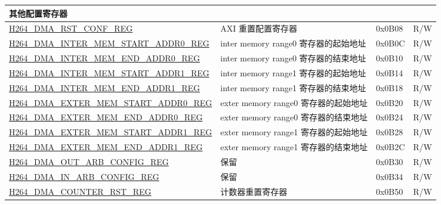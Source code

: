 \begin{longtable}{ | p{7.5cm} | p{5.7cm} | p{1.2cm} | p{1.5cm} | }
    \multicolumn{4}{|l|}{\textbf{其他配置寄存器}} \\ \hline
    \hyperref[regdesc:H264DMARSTCONFREG]{H264\_DMA\_RST\_CONF\_REG} & AXI 重置配置寄存器 & 0x0B08 & R/W \\ \hline
    \hyperref[regdesc:H264DMAINTERMEMSTARTADDR0REG]{H264\_DMA\_INTER\_MEM\_START\_ADDR0\_REG} & inter memory range0 寄存器的起始地址 & 0x0B0C & R/W \\ \hline
    \hyperref[regdesc:H264DMAINTERMEMENDADDR0REG]{H264\_DMA\_INTER\_MEM\_END\_ADDR0\_REG} & inter memory range0 寄存器的结束地址 & 0x0B10 & R/W \\ \hline
    \hyperref[regdesc:H264DMAINTERMEMSTARTADDR1REG]{H264\_DMA\_INTER\_MEM\_START\_ADDR1\_REG} & inter memory range1 寄存器的起始地址 & 0x0B14 & R/W \\ \hline
    \hyperref[regdesc:H264DMAINTERMEMENDADDR1REG]{H264\_DMA\_INTER\_MEM\_END\_ADDR1\_REG} & inter memory range1 寄存器的结束地址 & 0x0B18 & R/W \\ \hline
    \hyperref[regdesc:H264DMAEXTERMEMSTARTADDR0REG]{H264\_DMA\_EXTER\_MEM\_START\_ADDR0\_REG} & exter memory range0 寄存器的起始地址 & 0x0B20 & R/W \\ \hline
    \hyperref[regdesc:H264DMAEXTERMEMENDADDR0REG]{H264\_DMA\_EXTER\_MEM\_END\_ADDR0\_REG} & exter memory range0 寄存器的结束地址 & 0x0B24 & R/W \\ \hline
    \hyperref[regdesc:H264DMAEXTERMEMSTARTADDR1REG]{H264\_DMA\_EXTER\_MEM\_START\_ADDR1\_REG} & exter memory range1 寄存器的起始地址 & 0x0B28 & R/W \\ \hline
    \hyperref[regdesc:H264DMAEXTERMEMENDADDR1REG]{H264\_DMA\_EXTER\_MEM\_END\_ADDR1\_REG} & exter memory range1 寄存器的结束地址 & 0x0B2C & R/W \\ \hline
    \hyperref[regdesc:H264DMAOUTARBCONFIGREG]{H264\_DMA\_OUT\_ARB\_CONFIG\_REG} & 保留 & 0x0B30 & R/W \\ \hline
    \hyperref[regdesc:H264DMAINARBCONFIGREG]{H264\_DMA\_IN\_ARB\_CONFIG\_REG} & 保留 & 0x0B34 & R/W \\ \hline
    \hyperref[regdesc:H264DMACOUNTERRSTREG]{H264\_DMA\_COUNTER\_RST\_REG} & 计数器重置寄存器 & 0x0B50 & R/W \\ \hline


\end{longtable}
